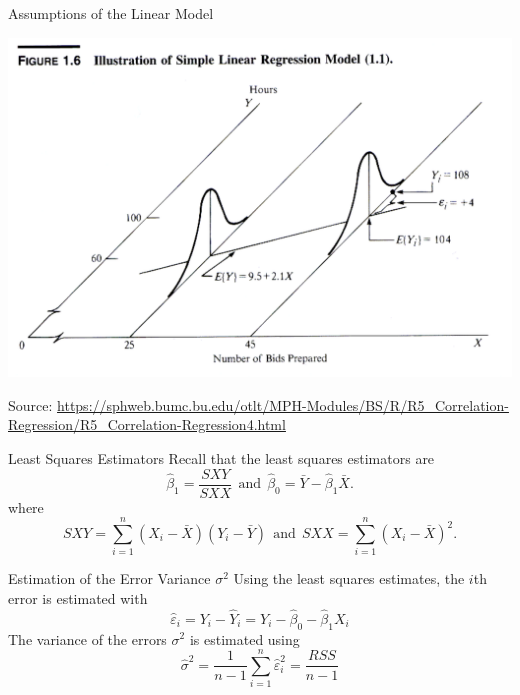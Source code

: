 \documentclass{beamer}
\begin{document}
\begin{frame}{Assumptions of the Linear Model}
    \begin{center}
        \includegraphics[width=.9\linewidth]{figures/linear_regression_normal.png}
    \end{center}
    \footnotesize 
    Source: \href{https://sphweb.bumc.bu.edu/otlt/MPH-Modules/BS/R/R5_Correlation-Regression/R5_Correlation-Regression4.html}{https://sphweb.bumc.bu.edu/otlt/MPH-Modules/BS/R/R5\_Correlation-Regression/R5\_Correlation-Regression4.html}
\end{frame}

\begin{frame}{Least Squares Estimators}
    Recall that the least squares estimators are 
    \begin{equation*}
        \hat{\beta}_1 = \frac{SXY}{SXX}\ \ \textrm{and}\ \ \hat{\beta}_0 = \bar{Y} - \hat{\beta}_1 \bar{X}.
    \end{equation*}
    where 
    \begin{equation*}
        SXY = \sum_{i=1}^n (X_i - \bar{X})(Y_i - \bar{Y})\ \ \textrm{and}\ \ SXX = \sum_{i=1}^n (X_i - \bar{X})^2.
    \end{equation*}
\end{frame}

\begin{frame}{Estimation of the Error Variance $\sigma^2$}
    Using the least squares estimates, the $i$th error is estimated with
    \begin{equation*}
        \hat{\varepsilon}_i = Y_i - \hat{Y}_i = Y_i - \hat{\beta}_0 - \hat{\beta}_1 X_i
    \end{equation*}
    The variance of the errors $\sigma^2$ is estimated using 
    \begin{equation*}
        \hat{\sigma}^2 = \frac{1}{n-1}\sum_{i=1}^n \hat{\varepsilon}_i^2 = \frac{RSS}{n-1}
    \end{equation*}
\end{frame}
\end{document}
